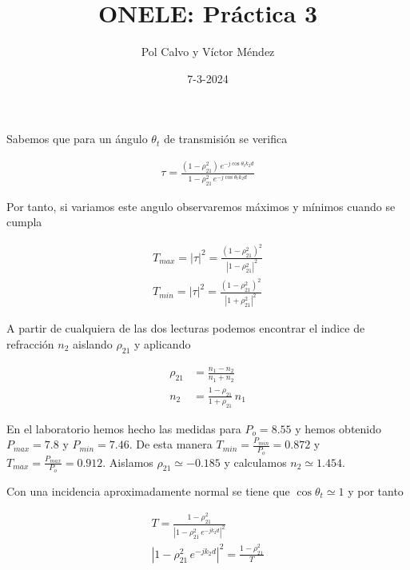\documentclass[spanish, a4paper, nobib]{tufte-handout}
\author{Pol Calvo y Víctor Méndez}
\title{ONELE: Práctica 3}
\date{7-3-2024}
\begin{document}
\maketitle


Sabemos que para un ángulo $\theta_t$ de transmisión se verifica

\begin{align}
    \tau = \frac{(1-\rho_{21}^2)\, e^{-j \cos{\theta_t} k_2d}}{1-\rho_{21}^2\,e^{-j \cos{\theta_t} k_2d}}
\end{align}

Por tanto, si variamos este angulo observaremos máximos y mínimos cuando se cumpla

\begin{align}
    T_{max} = |\tau|^2 = \frac{(1-\rho_{21}^2)^2}{|1-\rho_{21}^2|^2} \\
    T_{min} = |\tau|^2 = \frac{(1-\rho_{21}^2)^2}{|1+\rho_{21}^2|^2}
\end{align}

A partir de cualquiera de las dos lecturas podemos encontrar el indice de refracción $n_2$ aislando $\rho_{21}$ y aplicando

\begin{align}
    \rho_{21} &= \frac{n_1 - n_2}{n_1 + n_2} \\
    n_2 &= \frac{1-\rho_{21}}{1+\rho_{21}} \, n_1
\end{align}

En el laboratorio hemos hecho las medidas para $P_o=\num{8.55}$ y hemos obtenido $P_{max}=\num{7.8}$ y $P_{min}=\num{7.46}$. De esta manera $T_{min}=\frac{P_{min}}{P_o}=\num{0.872}$ y $T_{max}=\frac{P_{max}}{P_o}=\num{0.912}$. Aislamos $\rho_{21} \simeq \num{-0.185}$ y calculamos $n_2 \simeq \num{1.454}$.


Con una incidencia aproximadamente normal se tiene que $\cos{\theta_t}\simeq1$ y por tanto

\begin{gather}
    T = \frac{1-\rho_{21}^2}{|1-\rho_{21}^2\,e^{-jk_2d}|^2} \\
    |1-\rho_{21}^2\,e^{-jk_2d}|^2 = \frac{1-\rho_{21}^2}{T}
\end{gather}
\end{document}
